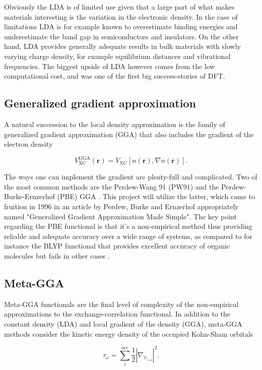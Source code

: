 Obviously the LDA is of limited use given that a large part of what makes materials interesting is the variation in the electronic density. In the case of limitations LDA is for example known to overestimate binding energies and  underestimate the band gap in semiconductors and insulators. On the other hand, LDA provides generally adequate results in bulk materials with slowly varying charge density, for example equilibrium distances and vibrational frequencies. The biggest upside of LDA however comes from the low computational cost, and was one of the first big success-stories of DFT. 


\subsection{Generalized gradient approximation}
A natural succession to the local density approximation is the family of generalized gradient approximation (GGA) that also includes the gradient of the electron density

\begin{equation}
V_\text{XC} ^\text{GGA} (\boldsymbol{r}) = V_\text{XC} [n(\boldsymbol{r}), \nabla n(\boldsymbol{r})].
\end{equation}

The ways one can implement the gradient are plenty-full and complicated. Two of the most common methods are the Perdew-Wang 91 (PW91) \cite{pw91} and the Perdew-Burke-Ernzerhof (PBE) GGA \cite{pbe}. This project will utilize the latter, which came to fruition in  1996 in an article by Perdew, Burke and Ernzerhof appropriately named "Generalized Gradient Approximation Made Simple". The key point regarding the PBE functional is that it's a non-empirical method thus providing reliable and adequate accuracy over a wide range of systems, as compared to for instance the BLYP functional that provides excellent accuracy of organic molecules but fails in other cases \cite{PBE_forum}. 

\subsection{Meta-GGA}   
Meta-GGA functionals are the final level of complexity of the non-empirical approximations to the exchange-correlation functional. In addition to the constant density (LDA) and local gradient of the density (GGA), meta-GGA methods consider the kinetic energy density of the occupied Kohn-Sham orbitals \cite{metagga}
 
\begin{equation}
	\tau_\omega = \sum_i ^\text{occ}\frac{1}{2}|\nabla_{\psi_{i, \omega}}|^2.
\end{equation}

